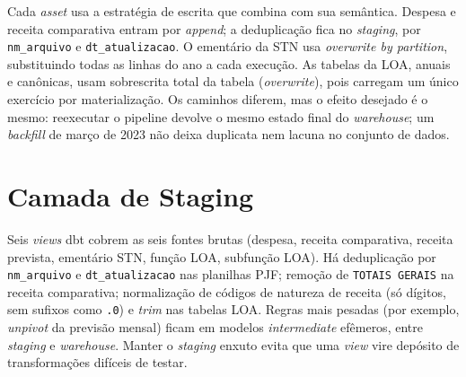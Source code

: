 Cada \textit{asset} usa a estratégia de escrita que combina com sua semântica. Despesa e receita comparativa entram por \textit{append}; a deduplicação fica no \textit{staging}, por \texttt{nm\_arquivo} e \texttt{dt\_atualizacao}. O ementário da STN usa \textit{overwrite by partition}, substituindo todas as linhas do ano a cada execução. As tabelas da LOA, anuais e canônicas, usam sobrescrita total da tabela (\textit{overwrite}), pois carregam um único exercício por materialização. Os caminhos diferem, mas o efeito desejado é o mesmo: reexecutar o pipeline devolve o mesmo estado final do \textit{warehouse}; um \textit{backfill} de março de 2023 não deixa duplicata nem lacuna no conjunto de dados.

\section{Camada de Staging}

Seis \textit{views} dbt cobrem as seis fontes brutas (despesa, receita comparativa, receita prevista, ementário STN, função LOA, subfunção LOA). Há deduplicação por \texttt{nm\_arquivo} e \texttt{dt\_atualizacao} nas planilhas PJF; remoção de \texttt{TOTAIS GERAIS} na receita comparativa; normalização de códigos de natureza de receita (só dígitos, sem sufixos como \texttt{.0}) e \textit{trim} nas tabelas LOA. Regras mais pesadas (por exemplo, \textit{unpivot} da previsão mensal) ficam em modelos \textit{intermediate} efêmeros, entre \textit{staging} e \textit{warehouse}. Manter o \textit{staging} enxuto evita que uma \textit{view} vire depósito de transformações difíceis de testar.




